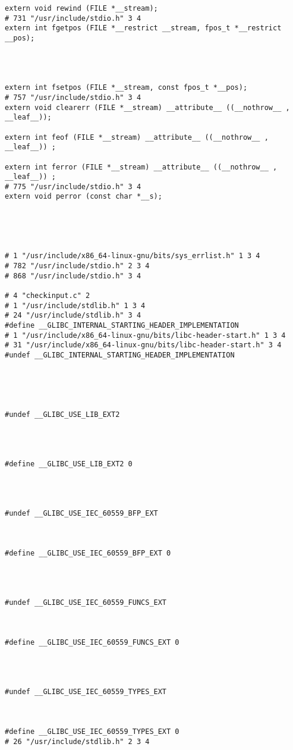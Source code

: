 \documentclass[11pt]{article}
\begin{document}
\begin{enumerate}
\begin{verbatim}
extern void rewind (FILE *__stream);
# 731 "/usr/include/stdio.h" 3 4
extern int fgetpos (FILE *__restrict __stream, fpos_t *__restrict __pos);




extern int fsetpos (FILE *__stream, const fpos_t *__pos);
# 757 "/usr/include/stdio.h" 3 4
extern void clearerr (FILE *__stream) __attribute__ ((__nothrow__ , __leaf__));

extern int feof (FILE *__stream) __attribute__ ((__nothrow__ , __leaf__)) ;

extern int ferror (FILE *__stream) __attribute__ ((__nothrow__ , __leaf__)) ;
# 775 "/usr/include/stdio.h" 3 4
extern void perror (const char *__s);





# 1 "/usr/include/x86_64-linux-gnu/bits/sys_errlist.h" 1 3 4
# 782 "/usr/include/stdio.h" 2 3 4
# 868 "/usr/include/stdio.h" 3 4

# 4 "checkinput.c" 2
# 1 "/usr/include/stdlib.h" 1 3 4
# 24 "/usr/include/stdlib.h" 3 4
#define __GLIBC_INTERNAL_STARTING_HEADER_IMPLEMENTATION 
# 1 "/usr/include/x86_64-linux-gnu/bits/libc-header-start.h" 1 3 4
# 31 "/usr/include/x86_64-linux-gnu/bits/libc-header-start.h" 3 4
#undef __GLIBC_INTERNAL_STARTING_HEADER_IMPLEMENTATION





#undef __GLIBC_USE_LIB_EXT2




#define __GLIBC_USE_LIB_EXT2 0




#undef __GLIBC_USE_IEC_60559_BFP_EXT



#define __GLIBC_USE_IEC_60559_BFP_EXT 0




#undef __GLIBC_USE_IEC_60559_FUNCS_EXT



#define __GLIBC_USE_IEC_60559_FUNCS_EXT 0




#undef __GLIBC_USE_IEC_60559_TYPES_EXT



#define __GLIBC_USE_IEC_60559_TYPES_EXT 0
# 26 "/usr/include/stdlib.h" 2 3 4



\end{verbatim}
\end{enumerate}
\end{document}
